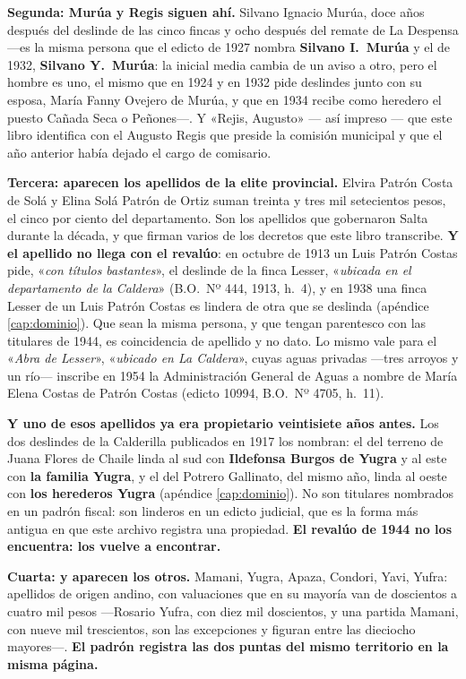 \textbf{Segunda: Murúa y Regis siguen ahí.} Silvano Ignacio Murúa, doce años después del
deslinde de las cinco fincas y ocho después del remate de La Despensa ---es la misma persona que el edicto de 1927 nombra \textbf{Silvano I.\ Murúa} y el de 1932, \textbf{Silvano Y.\ Murúa}: la inicial media cambia de un aviso a otro, pero el hombre es uno, el mismo que en 1924 y en 1932 pide deslindes junto con su esposa, María Fanny Ovejero de Murúa, y que en 1934 recibe como heredero el puesto Cañada Seca o Peñones---. Y «Rejis, Augusto»
--- así impreso --- que este libro identifica con el Augusto Regis que preside la comisión municipal y que el año anterior había dejado el cargo de comisario.

\textbf{Tercera: aparecen los apellidos de la elite provincial.} Elvira Patrón Costa de Solá y
Elina Solá Patrón de Ortiz suman treinta y tres mil setecientos pesos, el cinco por
ciento del departamento. Son los apellidos que gobernaron Salta durante la década, y que
firman varios de los decretos que este libro transcribe. \textbf{Y el apellido no llega con el
revalúo}: en octubre de 1913 un Luis Patrón Costas pide, «\textit{con títulos bastantes}», el
deslinde de la finca Lesser, «\textit{ubicada en el departamento de la Caldera}» (B.O.\ Nº 444,
1913, h.\ 4), y en 1938 una finca Lesser de un Luis Patrón Costas es lindera de otra que se
deslinda (apéndice \ref{cap:dominio}). Que sean la misma persona, y que tengan parentesco con las
titulares de 1944, es coincidencia de apellido y no dato. Lo mismo vale para el «\textit{Abra de Lesser}», «\textit{ubicado en La Caldera}», cuyas aguas privadas ---tres arroyos y un río--- inscribe en 1954 la Administración General de Aguas a nombre de María Elena Costas de Patrón Costas (edicto 10994, B.O.\ Nº 4705, h.\ 11).

\textbf{Y uno de esos apellidos ya era propietario veintisiete años antes.} Los dos deslindes de
la Calderilla publicados en 1917 los nombran: el del terreno de Juana Flores de Chaile linda al sud
con \textbf{Ildefonsa Burgos de Yugra} y al este con \textbf{la familia Yugra}, y el del Potrero
Gallinato, del mismo año, linda al oeste con \textbf{los herederos Yugra} (apéndice
\ref{cap:dominio}). No son titulares nombrados en un padrón fiscal: son linderos en un edicto
judicial, que es la forma más antigua en que este archivo registra una propiedad. \textbf{El revalúo
de 1944 no los encuentra: los vuelve a encontrar.}

\textbf{Cuarta: y aparecen los otros.} Mamani, Yugra, Apaza, Condori, Yavi, Yufra: apellidos de origen andino, con valuaciones que en su mayoría van de doscientos a cuatro mil pesos ---Rosario Yufra, con diez mil doscientos, y una partida Mamani, con nueve mil trescientos, son las excepciones y figuran entre las dieciocho mayores---. \textbf{El padrón
registra las dos puntas del mismo territorio en la misma página.}


